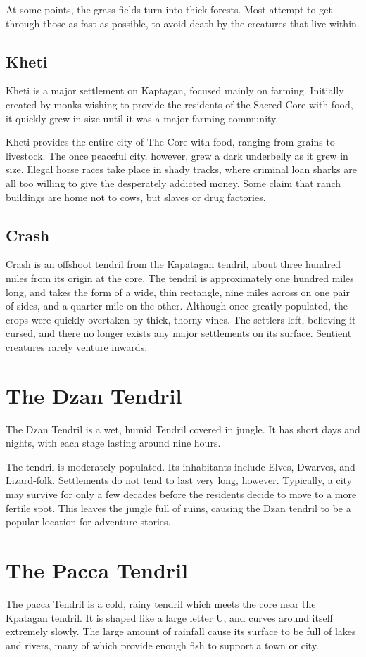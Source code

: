 \begin{multicols}{2}
At some points, the grass fields turn into thick forests.
Most attempt to get through those as fast as possible, to avoid death by the creatures that live within.

\subsection{Kheti}
Kheti is a major settlement on Kaptagan, focused mainly on farming.
Initially created by monks wishing to provide the residents of the Sacred Core with food, it quickly grew in size until it was a major farming community.

Kheti provides the entire city of The Core with food, ranging from grains to livestock.
The once peaceful city, however, grew a dark underbelly as it grew in size.
Illegal horse races take place in shady tracks, where criminal loan sharks are all too willing to give the desperately addicted money.
Some claim that ranch buildings are home not to cows, but slaves or drug factories.

\subsection{Crash}
Crash is an offshoot tendril from the Kapatagan tendril, about three hundred miles from its origin at the core.
The tendril is approximately one hundred miles long, and takes the form of a wide, thin rectangle, nine miles across on one pair of sides, and a quarter mile on the other.
Although once greatly populated, the crops were quickly overtaken by thick, thorny vines.
The settlers left, believing it cursed, and there no longer exists any major settlements on its surface.
Sentient creatures rarely venture inwards.

\section{The Dzan Tendril}
The Dzan Tendril is a wet, humid Tendril covered in jungle.
It has short days and nights, with each stage lasting around nine hours.

The tendril is moderately populated.
Its inhabitants include Elves, Dwarves, and Lizard-folk.
Settlements do not tend to last very long, however.
Typically, a city may survive for only a few decades before the residents decide to move to a more fertile spot.
This leaves the jungle full of ruins, causing the Dzan tendril to be a popular location for adventure stories.
\section{The Pacca Tendril}
The pacca Tendril is a cold, rainy tendril which meets the core near the Kpatagan tendril.
It is shaped like a large letter U, and curves around itself extremely slowly.
The large amount of rainfall cause its surface to be full of lakes and rivers, many of which provide enough fish to support a town or city.


\end{multicols}
